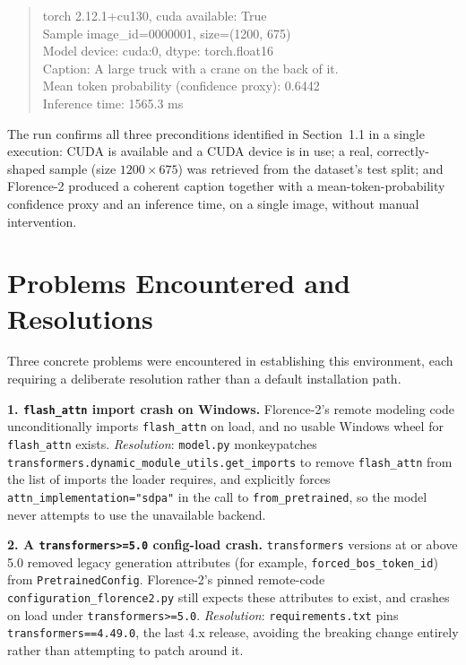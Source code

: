 \begin{quote}
\ttfamily
torch 2.12.1+cu130, cuda available: True\\
Sample image\_id=0000001, size=(1200, 675)\\
Model device: cuda:0, dtype: torch.float16\\
Caption: A large truck with a crane on the back of it.\\
Mean token probability (confidence proxy): 0.6442\\
Inference time: 1565.3 ms
\end{quote}

The run confirms all three preconditions identified in Section~1.1 in a single execution: CUDA is
available and a CUDA device is in use; a real, correctly-shaped sample (size $1200\times675$) was
retrieved from the dataset's test split; and Florence-2 produced a coherent caption together with a
mean-token-probability confidence proxy and an inference time, on a single image, without manual
intervention.

\section{Problems Encountered and Resolutions}

Three concrete problems were encountered in establishing this environment, each requiring a
deliberate resolution rather than a default installation path.

\textbf{1. \texttt{flash\_attn} import crash on Windows.} Florence-2's remote modeling code
unconditionally imports \texttt{flash\_attn} on load, and no usable Windows wheel for
\texttt{flash\_attn} exists. \emph{Resolution}: \texttt{model.py} monkeypatches
\texttt{transformers.dynamic\_module\_utils.get\_imports} to remove \texttt{flash\_attn} from the
list of imports the loader requires, and explicitly forces \texttt{attn\_implementation="sdpa"} in
the call to \texttt{from\_pretrained}, so the model never attempts to use the unavailable backend.

\textbf{2. A \texttt{transformers>=5.0} config-load crash.} \texttt{transformers} versions at or
above 5.0 removed legacy generation attributes (for example, \texttt{forced\_bos\_token\_id}) from
\texttt{PretrainedConfig}. Florence-2's pinned remote-code \texttt{configuration\_florence2.py}
still expects these attributes to exist, and crashes on load under \texttt{transformers>=5.0}.
\emph{Resolution}: \texttt{requirements.txt} pins \texttt{transformers==4.49.0}, the last 4.x
release, avoiding the breaking change entirely rather than attempting to patch around it.

